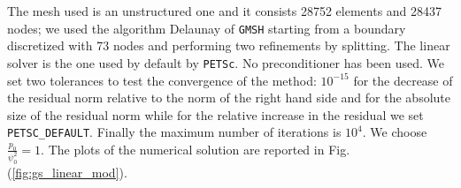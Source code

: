 The mesh used is an unstructured one and it consists 28752 elements and 28437 nodes; we used the algorithm Delaunay of \verb|GMSH| starting from a boundary discretized with 73 nodes and performing two refinements by splitting. The linear solver is the one used by default by \verb|PETSc|. No preconditioner has been used. We set two tolerances to test the convergence of the method: $10^{-15}$ for the decrease of the residual norm relative to the norm of the right hand side and for the absolute size of the residual norm while for the relative increase in the residual we set \verb|PETSC_DEFAULT|. Finally the maximum number of iterations is $10^4$. We choose $\frac{p_0}{\psi^2_0}=1$. The plots of the numerical solution are reported in Fig.(\ref{fig:gs_linear_mod}).

\begin{figure}
\centering
{}

\end{figure}
